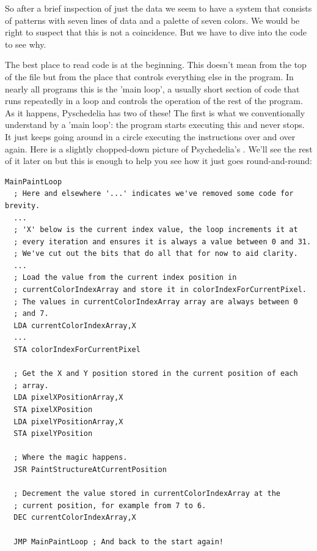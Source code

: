 So after a brief inspection of just the data we seem to have a system that consists of patterns with seven lines of data and a palette
of seven colors. We would be right to suspect that this is not a coincidence. But we have to dive into the code to see why.

The best place to read code is at the beginning. This doesn't mean from the top of the file but from the place that controls everything
else in the program. In nearly all programs this is the 'main loop', a usually short section of code that runs repeatedly in a loop and
controls the operation of the rest of the program. As it happens, Pyschedelia has two of these! The first is what we conventionally 
understand by a 'main loop': the program starts executing this and never stops. It just keeps going around in a circle executing the instructions 
over and over again. Here is a slightly chopped-down picture of Psychedelia's . We'll see the rest of it later on
but this is enough to help you see how it just goes round-and-round:

\begin{lstlisting}
MainPaintLoop   
  ; Here and elsewhere '...' indicates we've removed some code for brevity.
  ... 
  ; 'X' below is the current index value, the loop increments it at
  ; every iteration and ensures it is always a value between 0 and 31. 
  ; We've cut out the bits that do all that for now to aid clarity.
  ...
  ; Load the value from the current index position in
  ; currentColorIndexArray and store it in colorIndexForCurrentPixel.
  ; The values in currentColorIndexArray array are always between 0 
  ; and 7. 
  LDA currentColorIndexArray,X
  ...
  STA colorIndexForCurrentPixel

  ; Get the X and Y position stored in the current position of each
  ; array.
  LDA pixelXPositionArray,X
  STA pixelXPosition
  LDA pixelYPositionArray,X
  STA pixelYPosition

  ; Where the magic happens.
  JSR PaintStructureAtCurrentPosition

  ; Decrement the value stored in currentColorIndexArray at the
  ; current position, for example from 7 to 6.
  DEC currentColorIndexArray,X

  JMP MainPaintLoop ; And back to the start again!
\end{lstlisting}

